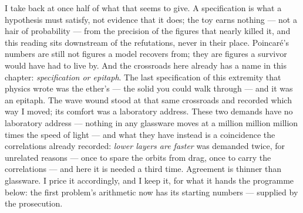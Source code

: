 \documentclass[fontsize=11pt,paper=a4,pagesize=auto,parskip=half-]{scrbook}
\newcommand{\Iy}[1]{#1\index{#1}}
\begin{document}
I take back at once half of what that seems to give. A specification is what a hypothesis must satisfy, not evidence that it does; the toy earns nothing --- not a hair of probability --- from the precision of the figures that nearly killed it, and this reading sits downstream of the refutations, never in their place. \Iy{Poincar\'e}'s numbers are still not figures a model recovers from; they are figures a survivor would have had to live by. And the crossroads here already has a name in this chapter: \emph{specification or epitaph}. The last specification of this extremity that physics wrote was the ether's --- the solid you could walk through --- and it was an epitaph. The wave wound stood at that same crossroads and recorded which way I moved; its comfort was a laboratory address. These two demands have no laboratory address --- nothing in any glassware moves at a million million million times the speed of light --- and what they have instead is a coincidence the correlations already recorded: \emph{lower layers are faster} was demanded twice, for unrelated reasons --- once to spare the orbits from drag, once to carry the correlations --- and here it is needed a third time. Agreement is thinner than glassware. I price it accordingly, and I keep it, for what it hands the programme below: the first problem's arithmetic now has its starting numbers --- supplied by the prosecution.
\end{document}
